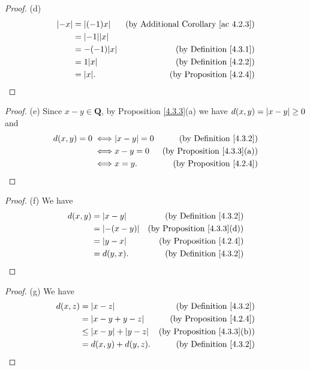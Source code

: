 \begin{proof}{(d)}
\begin{align*}
        \abs*{-x} & = \abs*{(-1)x}       & \text{(by Additional Corollary \ref{ac 4.2.3})} \\
                  & = \abs*{-1} \abs*{x}                                                   \\
                  & = -(-1) \abs*{x}     & \text{(by Definition \ref{4.3.1})}              \\
                  & = 1 \abs*{x}         & \text{(by Definition \ref{4.2.2})}              \\
                  & = \abs*{x}.          & \text{(by Proposition \ref{4.2.4})}
    \end{align*}
\end{proof}

\begin{proof}{(e)}
    Since \(x - y \in \mathbf{Q}\), by Proposition \ref{4.3.3}(a) we have \(d(x, y) = \abs*{x - y} \geq 0\) and
    \begin{align*}
        d(x, y) = 0
        \iff & \abs*{x - y} = 0 & \text{(by Definition \ref{4.3.2})}     \\
        \iff & x - y = 0        & \text{(by Proposition \ref{4.3.3}(a))} \\
        \iff & x = y.           & \text{(by Proposition \ref{4.2.4})}
    \end{align*}
\end{proof}

\begin{proof}{(f)}
    We have
    \begin{align*}
        d(x, y) & = \abs*{x - y}    & \text{(by Definition \ref{4.3.2})}     \\
                & = \abs*{-(x - y)} & \text{(by Proposition \ref{4.3.3}(d))} \\
                & = \abs*{y - x}    & \text{(by Proposition \ref{4.2.4})}    \\
                & = d(y, x).        & \text{(by Definition \ref{4.3.2})}
    \end{align*}
\end{proof}

\begin{proof}{(g)}
    We have
    \begin{align*}
        d(x, z) & = \abs*{x - z}                   & \text{(by Definition \ref{4.3.2})}     \\
                & = \abs*{x - y + y - z}           & \text{(by Proposition \ref{4.2.4})}    \\
                & \leq \abs*{x - y} + \abs*{y - z} & \text{(by Proposition \ref{4.3.3}(b))} \\
                & = d(x, y) + d(y, z).             & \text{(by Definition \ref{4.3.2})}     \\
    \end{align*}
\end{proof}


